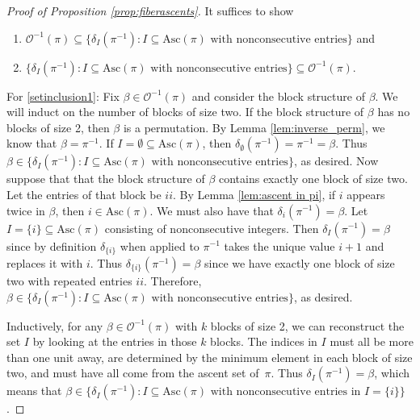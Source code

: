 \documentclass[11pt,reqno]{amsart}
\newcommand{\Asc}{\mathrm{Asc}}
\newcommand{\Out}{\mathcal{O}}
\begin{document}
    
\begin{proof}[Proof of Proposition \ref{prop:fiberascents}]
It suffices to show
\begin{enumerate}
    \item $\Out^{-1}(\pi)\subseteq \{\delta_I(\pi^{-1}): I\subseteq \Asc(\pi) \mbox{ with nonconsecutive entries}\}$ and \label{setinclusion1}
    \item $ \{\delta_I(\pi^{-1}): I\subseteq \Asc(\pi) \mbox{ with nonconsecutive entries}\} \subseteq \Out^{-1}(\pi)$.\label{setinclusion2}
\end{enumerate}

\noindent For \eqref{setinclusion1}:  Fix $\beta \in \Out^{-1}(\pi)$ and consider the block structure of $\beta$. We will induct on the number of blocks of size two.
If the block structure of $\beta$ has no blocks of size 2, then $\beta$ is a permutation. By Lemma \ref{lem:inverse_perm}, we know that $\beta=\pi^{-1}$. If $I=\emptyset\subseteq\Asc(\pi)$,  then $\delta_{\emptyset}(\pi^{-1})=\pi^{-1}=\beta$. Thus $\beta\in\{\delta_I(\pi^{-1}): I\subseteq \Asc(\pi) \mbox{ with nonconsecutive entries}\}$, as desired. 
Now suppose that 
that the block structure of $\beta$ contains exactly one block of size two. 
Let the entries of that block be $ii$.
By Lemma \ref{lem:ascent in pi}, if $i$ appears twice in $\beta$, then $i\in\Asc(\pi)$. We must also have that $\delta_i(\pi^{-1}) = \beta$. 
Let $I=\{ i\}\subseteq\Asc(\pi)$ consisting of nonconsecutive integers. Then $\delta_{I}(\pi^{-1})=\beta$ since by definition $\delta_{\{i\}}$ when applied to $\pi^{-1}$ takes the unique value $i+1$ and replaces it with $i$. Thus $\delta_{\{i\}}(\pi^{-1})=\beta$ since we have exactly one block of size two with repeated entries $ii$.
Therefore, $\beta \in \{\delta_I(\pi^{-1}): I\subseteq \Asc(\pi) \mbox{ with nonconsecutive entries}\}$, as desired. 

Inductively, for any $\beta \in \Out^{-1}(\pi)$ with $k$ blocks of size 2, we can reconstruct the set $I$ by looking at the entries in those $k$ blocks. The indices in $I$ must all be more than one unit away, are determined by the minimum element in each block of size two, and must have all come from the ascent set of~$\pi$. Thus $\delta_I(\pi^{-1}) = \beta$, which means that $\beta \in \{\delta_I(\pi^{-1}): I\subseteq \Asc(\pi) \mbox{ with nonconsecutive entries}$ in $I=\{ i\}\}$.


\end{proof}
\end{document}

